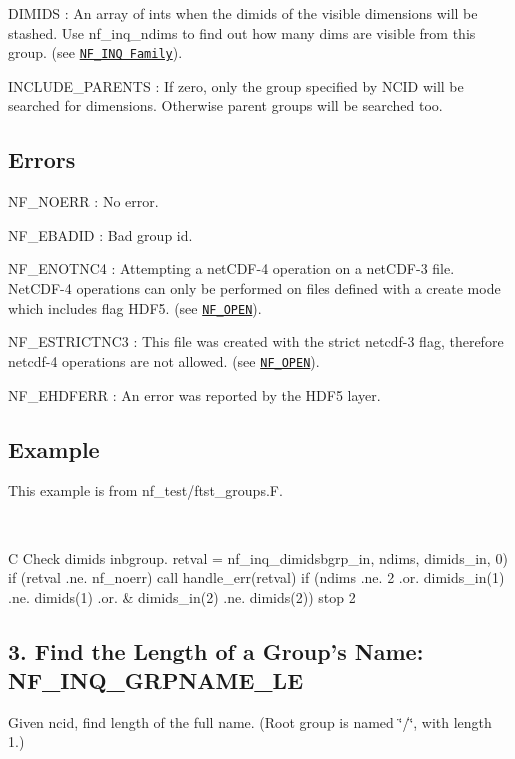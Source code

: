 {\ttfamily D\+I\+M\+I\+DS} \+: An array of ints when the dimids of the visible dimensions will be stashed. Use nf\+\_\+inq\+\_\+ndims to find out how many dims are visible from this group. (see \href{#NF_005fINQ-Family}{\tt N\+F\+\_\+\+I\+NQ Family}).

{\ttfamily I\+N\+C\+L\+U\+D\+E\+\_\+\+P\+A\+R\+E\+N\+TS} \+: If zero, only the group specified by N\+C\+ID will be searched for dimensions. Otherwise parent groups will be searched too.

\subsection*{Errors }

{\ttfamily N\+F\+\_\+\+N\+O\+E\+RR} \+: No error.

{\ttfamily N\+F\+\_\+\+E\+B\+A\+D\+ID} \+: Bad group id.

{\ttfamily N\+F\+\_\+\+E\+N\+O\+T\+N\+C4} \+: Attempting a net\+C\+D\+F-\/4 operation on a net\+C\+D\+F-\/3 file. Net\+C\+D\+F-\/4 operations can only be performed on files defined with a create mode which includes flag H\+D\+F5. (see \href{#NF_005fOPEN}{\tt N\+F\+\_\+\+O\+P\+EN}).

{\ttfamily N\+F\+\_\+\+E\+S\+T\+R\+I\+C\+T\+N\+C3} \+: This file was created with the strict netcdf-\/3 flag, therefore netcdf-\/4 operations are not allowed. (see \href{#NF_005fOPEN}{\tt N\+F\+\_\+\+O\+P\+EN}).

{\ttfamily N\+F\+\_\+\+E\+H\+D\+F\+E\+RR} \+: An error was reported by the H\+D\+F5 layer.

\subsection*{Example }

This example is from nf\+\_\+test/ftst\+\_\+groups.\+F.

 

C Check dimids inbgroup. retval = nf\+\_\+inq\+\_\+dimidsbgrp\+\_\+in, ndims, dimids\+\_\+in, 0) if (retval .ne. nf\+\_\+noerr) call handle\+\_\+err(retval) if (ndims .ne. 2 .or. dimids\+\_\+in(1) .ne. dimids(1) .or. \& dimids\+\_\+in(2) .ne. dimids(2)) stop 2\hypertarget{nc_f77_interface_guide_f77_NF-INQ-GRPNAME-LE}{}\subsection{3. Find the Length of a Group’s Name\+: N\+F\+\_\+\+I\+N\+Q\+\_\+\+G\+R\+P\+N\+A\+M\+E\+\_\+\+L\+E }\label{nc_f77_interface_guide_f77_NF-INQ-GRPNAME-LE}
Given ncid, find length of the full name. (Root group is named \char`\"{}/\char`\"{}, with length 1.)

